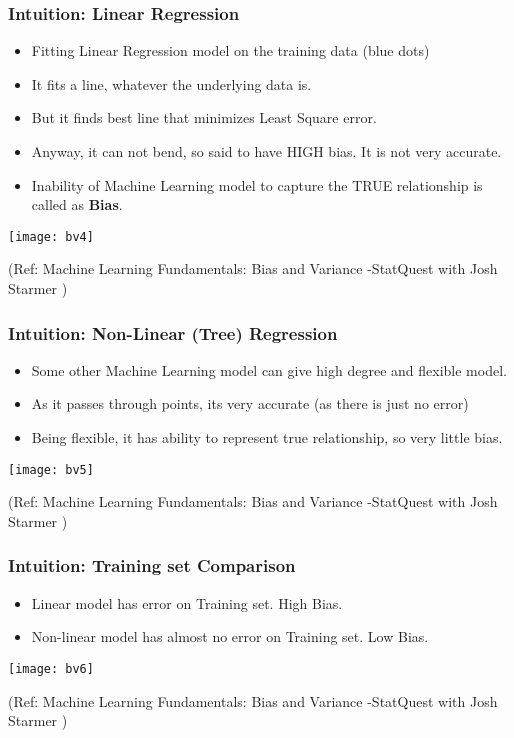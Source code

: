 \begin{frame}[fragile]\frametitle{Intuition: Linear Regression}
	\begin{itemize}
	\item Fitting Linear Regression model on the training data (blue dots)
	\item It fits a line, whatever the underlying data is.
	\item But it finds best line that minimizes Least Square error.
	\item Anyway, it can not bend, so said to have HIGH bias. It is not very accurate.
	\item Inability of Machine Learning model to capture the TRUE relationship is called as {\bf Bias}.
	\end{itemize}
	
\begin{center}
\texttt{[image: bv4]}
\end{center}
	
\tiny{(Ref: Machine Learning Fundamentals: Bias and Variance -StatQuest with Josh Starmer )}
\end{frame}

\begin{frame}[fragile]\frametitle{Intuition: Non-Linear (Tree) Regression}
	\begin{itemize}
	\item Some other Machine Learning model can give high degree and flexible model.
	\item As it passes through points, its very accurate (as there is just no error)
	\item Being flexible, it has ability to represent true relationship, so very little bias.
	\end{itemize}
	
\begin{center}
\texttt{[image: bv5]}
\end{center}
	
\tiny{(Ref: Machine Learning Fundamentals: Bias and Variance -StatQuest with Josh Starmer )}
\end{frame}

\begin{frame}[fragile]\frametitle{Intuition: Training set Comparison}
	\begin{itemize}
	\item Linear model has error on Training set. High Bias.
	\item Non-linear model has almost no error on Training set. Low Bias.
	\end{itemize}
	
\begin{center}
\texttt{[image: bv6]}
\end{center}
	
\tiny{(Ref: Machine Learning Fundamentals: Bias and Variance -StatQuest with Josh Starmer )}
\end{frame}

